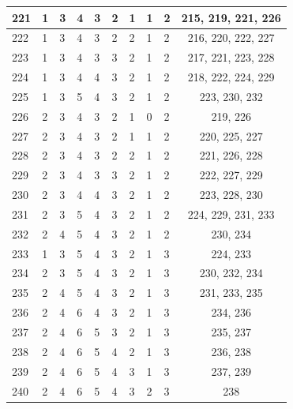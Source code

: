 \begin{longtable}{|l|l|l|l|l|l|l|l|l|c|}
221 & 1 & 3 & 4 & 3 & 2 & 1 & 1 & 2 & 215, 219, 221, 226 \\ \hline
222 & 1 & 3 & 4 & 3 & 2 & 2 & 1 & 2 & 216, 220, 222, 227 \\ \hline
223 & 1 & 3 & 4 & 3 & 3 & 2 & 1 & 2 & 217, 221, 223, 228 \\ \hline
224 & 1 & 3 & 4 & 4 & 3 & 2 & 1 & 2 & 218, 222, 224, 229 \\ \hline
225 & 1 & 3 & 5 & 4 & 3 & 2 & 1 & 2 & 223, 230, 232 \\ \hline
226 & 2 & 3 & 4 & 3 & 2 & 1 & 0 & 2 & 219, 226 \\ \hline
227 & 2 & 3 & 4 & 3 & 2 & 1 & 1 & 2 & 220, 225, 227 \\ \hline
228 & 2 & 3 & 4 & 3 & 2 & 2 & 1 & 2 & 221, 226, 228 \\ \hline
229 & 2 & 3 & 4 & 3 & 3 & 2 & 1 & 2 & 222, 227, 229 \\ \hline
230 & 2 & 3 & 4 & 4 & 3 & 2 & 1 & 2 & 223, 228, 230 \\ \hline
231 & 2 & 3 & 5 & 4 & 3 & 2 & 1 & 2 & 224, 229, 231, 233 \\ \hline
232 & 2 & 4 & 5 & 4 & 3 & 2 & 1 & 2 & 230, 234 \\ \hline
233 & 1 & 3 & 5 & 4 & 3 & 2 & 1 & 3 & 224, 233 \\ \hline
234 & 2 & 3 & 5 & 4 & 3 & 2 & 1 & 3 & 230, 232, 234 \\ \hline
235 & 2 & 4 & 5 & 4 & 3 & 2 & 1 & 3 & 231, 233, 235 \\ \hline
236 & 2 & 4 & 6 & 4 & 3 & 2 & 1 & 3 & 234, 236 \\ \hline
237 & 2 & 4 & 6 & 5 & 3 & 2 & 1 & 3 & 235, 237 \\ \hline
238 & 2 & 4 & 6 & 5 & 4 & 2 & 1 & 3 & 236, 238 \\ \hline
239 & 2 & 4 & 6 & 5 & 4 & 3 & 1 & 3 & 237, 239 \\ \hline
240 & 2 & 4 & 6 & 5 & 4 & 3 & 2 & 3 & 238 \\ \hline

\end{longtable}